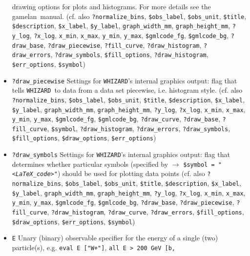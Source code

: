 \documentclass[12pt]{book}
\newcommand{\ttt}[1]{\texttt{#1}}
\newcommand{\whizard}{\texttt{WHIZARD}}
\newcommand{\gamelan}{\textsf{gamelan}}
\begin{document}
\begin{itemize}
drawing options for plots and histograms. For more details see the
\gamelan\ manual. (cf. also
\ttt{?normalize\_bins}, \ttt{\$obs\_label}, \ttt{\$obs\_unit}, 
\ttt{\$title}, \ttt{\$description}, \ttt{\$x\_label},
\ttt{\$y\_label}, \ttt{graph\_width\_mm}, \ttt{graph\_height\_mm},
\ttt{?y\_log}, \ttt{?x\_log}, \ttt{x\_min}, \ttt{x\_max}, 
\ttt{y\_min}, \ttt{y\_max}, \ttt{\$gmlcode\_fg}, \ttt{\$gmlcode\_bg},
\ttt{?draw\_base}, \newline \ttt{?draw\_piecewise},
\ttt{?fill\_curve}, \ttt{?draw\_histogram}, \ttt{?draw\_errors},
\ttt{?draw\_symbols}, \newline \ttt{\$fill\_options}, \ttt{?draw\_histogram},
\ttt{\$err\_options}, \ttt{\$symbol})
\item
\ttt{?draw\_piecewise} \newline
Settings for \whizard's internal graphics output: flag that tells
\whizard\ to data from a data set piecewise, i.e. histogram
style. (cf. also \ttt{?normalize\_bins}, \ttt{\$obs\_label},
\ttt{\$obs\_unit},  \ttt{\$title}, \ttt{\$description},
\ttt{\$x\_label}, \ttt{\$y\_label}, \ttt{graph\_width\_mm},
\ttt{graph\_height\_mm}, \ttt{?y\_log}, \ttt{?x\_log}, \ttt{x\_min},
\ttt{x\_max},  \ttt{y\_min}, \ttt{y\_max}, \ttt{\$gmlcode\_fg},
\ttt{\$gmlcode\_bg},  \ttt{?draw\_curve}, \ttt{?draw\_base},
\ttt{?fill\_curve}, \ttt{\$symbol}, \ttt{?draw\_histogram},
\ttt{?draw\_errors}, \ttt{?draw\_symbols}, \ttt{\$fill\_options},
\ttt{\$draw\_options}, \ttt{\$err\_options})
\item
\ttt{?draw\_symbols} \newline
Settings for \whizard's internal graphics output: flag that determines
whether particular symbols (specified by $\to$ \ttt{\$symbol =
"{\em <LaTeX\_code>}"}) should be used for plotting data points  (cf. also
\ttt{?normalize\_bins}, \ttt{\$obs\_label}, \ttt{\$obs\_unit}, 
\ttt{\$title}, \ttt{\$description}, \ttt{\$x\_label},
\ttt{\$y\_label}, \ttt{graph\_width\_mm}, \ttt{graph\_height\_mm},
\ttt{?y\_log}, \ttt{?x\_log}, \ttt{x\_min}, \ttt{x\_max}, 
\ttt{y\_min}, \ttt{y\_max}, \ttt{\$gmlcode\_fg}, \ttt{\$gmlcode\_bg},
\ttt{?draw\_base}, \ttt{?draw\_piecewise},
\ttt{?fill\_curve}, \ttt{?draw\_histogram}, \ttt{?draw\_curve},
\ttt{?draw\_errors}, \ttt{\$fill\_options},
\ttt{\$draw\_options}, \newline \ttt{\$err\_options}, \ttt{\$symbol})
\item
\ttt{E} \newline
Unary (binary) observable specifier for the energy of a single
(two) particle(s), e.g. \ttt{eval E ["W+"]}, \ttt{all E > 200 GeV [b,
}
\end{itemize}
\end{document}
